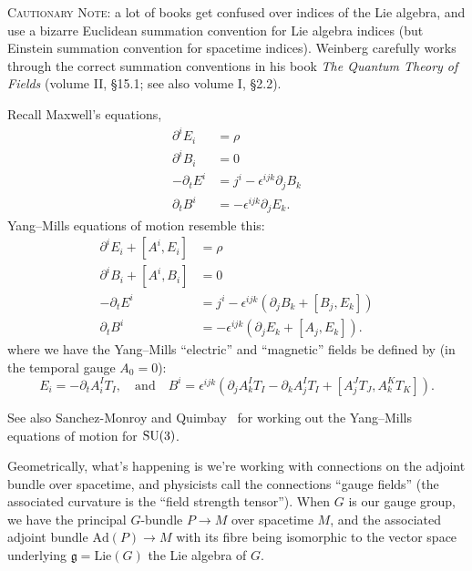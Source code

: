 \textsc{Cautionary Note}: a lot of books get confused over indices of
the Lie algebra, and use a bizarre Euclidean summation convention for
Lie algebra indices (but Einstein summation convention for spacetime
indices). Weinberg carefully works through the correct summation
conventions in his book \textit{The Quantum Theory of Fields}
(volume II, \S15.1; see also volume I, \S2.2).

Recall Maxwell's equations,
\begin{subequations}
\begin{align}
\partial^{i}E_{i} &= \rho\\
\partial^{i}B_{i} &= 0\\
-\partial_{t}E^{i} &= j^{i} -\epsilon^{ijk}\partial_{j}B_{k}\\
\partial_{t}B^{i} &= -\epsilon^{ijk}\partial_{j}E_{k}.
\end{align}
\end{subequations}
Yang--Mills equations of motion resemble this:
\begin{subequations}
\begin{align}
\partial^{i}E_{i} + [A^{i},E_{i}] &= \rho\\
\partial^{i}B_{i} + [A^{i},B_{i}] &= 0\\
-\partial_{t}E^{i} &= j^{i} -\epsilon^{ijk}(\partial_{j}B_{k} + [B_{j},E_{k}])\\
\partial_{t}B^{i} &= -\epsilon^{ijk}(\partial_{j}E_{k} + [A_{j},E_{k}]).
\end{align}
\end{subequations}
where we have the Yang--Mills ``electric'' and ``magnetic'' fields be
defined by (in the temporal gauge $A_{0}=0$):
\begin{equation}
E_{i} = -\partial_{t}A_{i}^{I}T_{I},\quad\mbox{and}\quad
B^{i} = \epsilon^{ijk}(\partial_{j}A_{k}^{I}T_{I} - \partial_{k}A_{j}^{I}T_{I}
+ [A_{j}^{J}T_{J}, A_{k}^{K}T_{K}]).
\end{equation}

\begin{remark}
See also Sanchez-Monroy and Quimbay~\cite{Sanchez-Monroy:2006sie} for
working out the Yang--Mills equations of motion for $\operatorname{SU}(3)$.
\end{remark}

\M
Geometrically, what's happening is we're working with connections on the
adjoint bundle over spacetime, and physicists call the connections
``gauge fields'' (the associated curvature is the ``field strength tensor'').
When $G$ is our gauge group, we have the principal $G$-bundle $P\to M$
over spacetime $M$, and the associated adjoint bundle $\mathrm{Ad}(P)\to M$
with its fibre being isomorphic to the vector space underlying
$\mathfrak{g}=\mathrm{Lie}(G)$ the Lie algebra of $G$.

